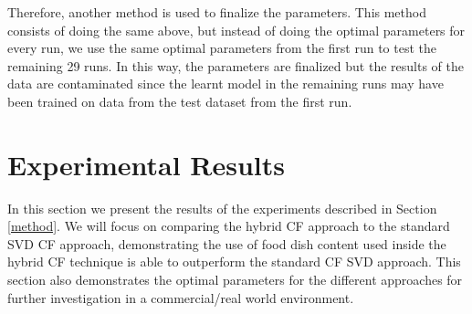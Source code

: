 Therefore, another method is used to finalize the parameters. This method consists of doing the same above, but instead of doing the optimal parameters for every run, we use the same optimal parameters from the first run to test the remaining 29 runs. In this way, the parameters are finalized but the results of the data are contaminated since the learnt model in the remaining runs may have been trained on data from the test dataset from the first run.  

\section{Experimental Results}

In this section we present the results of the experiments described in Section \ref{method}. We will focus on comparing the hybrid CF approach to the standard SVD CF approach, demonstrating the use of food dish content used inside the hybrid CF technique is able to outperform the standard CF SVD approach. This section also demonstrates the optimal parameters for the different approaches for further investigation in a commercial/real world environment.  

